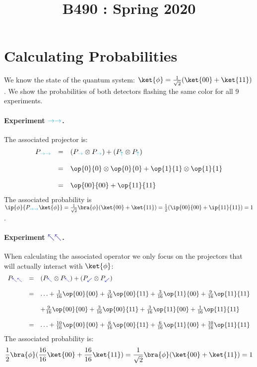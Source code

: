 \documentclass{article}
\title{
    \vspace{2in}
    \textmd{\textbf{\tit}}\\
    \normalsize\vspace{0.1in}\small{B490 : Spring 2020 }\\
    \vspace{0.1in}\large{\textit{\auths}}
    \vspace{3in}
}
\date{}
\newcommand{\xplus}{{\color{cyan}\rightarrow}}
\newcommand{\xminus}{{\color{cyan}\uparrow}}
\newcommand{\yplus}{{\color{blue}\nwarrow}}
\newcommand{\yminus}{{\color{blue}\swarrow}}
\theoremstyle{remark}
\def\srtt{\frac{1}{\sqrt{2}}}
\begin{document}
\maketitle
\pagebreak


\section{Calculating Probabilities}
We know the state of the quantum system: $\ket{\phi} = \srtt(\ket{00} + \ket{11})$.
We show the probabilities of both detectors flashing the same color for all 
9 experiments.
\paragraph*{Experiment $\xplus\xplus$.} The associated projector is:
\[\begin{array}{rcl}
P_{\xplus\xplus} &=& (P_{\xplus}\otimes P_{\xplus}) + (P_{\xminus} \otimes P_{\xminus})\\
\\
&=& \op{0}{0} \otimes \op{0}{0} + \op{1}{1} \otimes \op{1}{1} \\
\\
&=& \op{00}{00} + \op{11}{11} 
\end{array}\]
The associated probability is 
$\ip{\phi}{P_{\xplus\xplus}\ket{\phi}} = \frac{1}{\sqrt{2}} \bra{\phi}(\ket{00}+\ket{11}) 
= \frac{1}{2} (\ip{00}{00} + \ip{11}{11}) = 1$.

\paragraph*{Experiment $\yplus\yplus$.} When calculating the
associated operator we only focus on the projectors that will actually
interact with $\ket{\phi}$: 
\[\begin{array}{rcl}
P_{\yplus\yplus} &=& (P_{\yplus}\otimes P_{\yplus}) + (P_{\yminus} \otimes P_{\yminus})\\
\\
&=& \ldots 
+   \frac{1}{16} \op{00}{00} + \frac{3}{16}\op{00}{11} + \frac{3}{16}\op{11}{00} + \frac{9}{16} \op{11}{11}\\
\\
&& + 
\frac{9}{16} \op{00}{00} + \frac{3}{16}\op{00}{11} + \frac{3}{16}\op{11}{00} + \frac{1}{16} \op{11}{11} \\
\\
&=& \ldots + \frac{10}{16} \op{00}{00} + \frac{6}{16}\op{00}{11} + \frac{6}{16}\op{11}{00} + \frac{10}{16} \op{11}{11} \\
\end{array}\]
The associated probability is:
\[
  \frac{1}{2} \bra{\phi} (\frac{16}{16} \ket{00} + \frac{16}{16} \ket{11}) = 
  \srtt \bra{\phi} (\ket{00} + \ket{11}) =  1
\]
\end{document}

